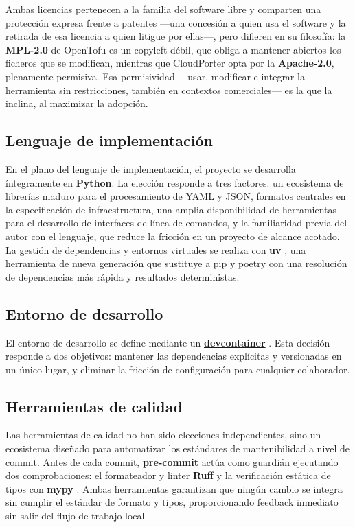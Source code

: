 Ambas licencias pertenecen a la familia del software libre y comparten una protección
expresa frente a patentes —una concesión a quien usa el software y la retirada de esa
licencia a quien litigue por ellas—, pero difieren en su filosofía: la \textbf{MPL-2.0}
de OpenTofu es un copyleft débil, que obliga a mantener abiertos los ficheros que se
modifican, mientras que CloudPorter opta por la \textbf{Apache-2.0}, plenamente permisiva.
Esa permisividad —usar, modificar e integrar la herramienta sin restricciones, también en
contextos comerciales— es la que la inclina, al maximizar la adopción.

\subsection{Lenguaje de implementación}

En el plano del lenguaje de implementación, el proyecto se desarrolla íntegramente
en \textbf{Python}. La elección responde a tres factores: un ecosistema de
librerías maduro para el procesamiento de YAML y JSON, formatos centrales en
la especificación de infraestructura, una amplia disponibilidad de herramientas
para el desarrollo de interfaces de línea de comandos, y la familiaridad previa
del autor con el lenguaje, que reduce la fricción en un proyecto de alcance
acotado. La gestión de dependencias y entornos virtuales se realiza con
\textbf{uv} \cite{uvDocs}, una herramienta de nueva generación que sustituye
a pip y poetry con una resolución de dependencias más rápida y resultados
deterministas.

\subsection{Entorno de desarrollo}

El entorno de desarrollo se define mediante un \hyperlink{devcontainer}{\textbf{devcontainer}} \cite{devcontainerDocs}.
Esta decisión responde a dos objetivos: mantener las dependencias explícitas y
versionadas en un único lugar, y eliminar la fricción de configuración para
cualquier colaborador.

\subsection{Herramientas de calidad}

Las herramientas de calidad no han sido elecciones independientes, sino un ecosistema
diseñado para automatizar los estándares de mantenibilidad a nivel de commit. 
Antes de cada commit, \textbf{pre-commit} \cite{precommitDocs} actúa como guardián 
ejecutando dos comprobaciones: el formateador y linter \textbf{Ruff} \cite{ruffDocs}
y la verificación estática de tipos con \textbf{mypy} \cite{mypyDocs}. Ambas herramientas
garantizan que ningún cambio se integra sin cumplir el estándar de formato y
tipos, proporcionando feedback inmediato sin salir del flujo de trabajo local.

